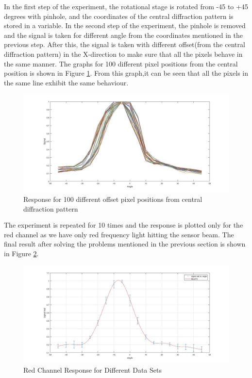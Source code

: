 In the first step of the experiment, the rotational stage is rotated from -45 to +45 degrees with pinhole, and the coordinates of the central diffraction pattern is stored in a variable. In the second step of the experiment, the pinhole is removed and the signal is taken for different angle from the coordinates mentioned in the previous step. After this, the signal is taken with different offset(from the central diffraction pattern) in the X-direction to make sure that all the pixels behave in the same manner. The graphs for 100 different pixel positions from the central position is shown in Figure \ref{fig:offset_calib}. From this graph,it can be seen that all the pixels in the same line exhibit the same behaviour.
\begin{figure}[!h]
\centering
\includegraphics[scale=0.275]{pics/ResponseOffset.jpg}
\caption{Response for 100 different offset pixel positions from central diffraction pattern}
\label{fig:offset_calib}
\end{figure}
The experiment is repeated for 10 times and the response is plotted only for the red channel as we have only red frequency light hitting the sensor beam. The final result after solving the problems mentioned in the previous section is shown in Figure \ref{fig:acceptance_final}.
\begin{figure}[!h]
\centering
\includegraphics[scale=0.275]{pics/FinalCRAExp.jpg}
\caption{Red Channel Response for Different Data Sets}
\label{fig:acceptance_final}
\end{figure}
